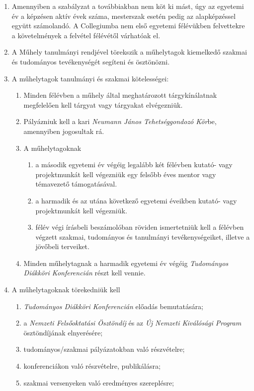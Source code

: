 \documentclass{../styles/rulebook}
\begin{document}
\begin{enumerate}
\item Amennyiben a szabályzat a továbbiakban nem köt ki mást, úgy az egyetemi év a képzésen aktív évek száma, mesterszak esetén pedig az alapképzéssel együtt számolandó. A Collegiumba nem első egyetemi félévükben felvettekre a követelmények a felvétel félévétől várhatóak el.
\item A Műhely tanulmányi rendjével törekszik a műhelytagok kiemelkedő szakmai és tudományos tevékenységét segíteni és ösztönözni.
\item A műhelytagok tanulmányi és szakmai kötelességei:
	\begin{enumerate}
		\item Minden félévben a műhely által meghatározott tárgykínálatnak megfelelően kell tárgyat vagy tárgyakat elvégezniük.
		\item Pályázniuk kell a kari \emph{Neumann János Tehetséggondozó Kör}be, amennyiben jogosultak rá.
		\item A műhelytagoknak
			\begin{enumerate}
				\item a második egyetemi év végéig legalább két félévben kutató- vagy projektmunkát kell végezniük egy felsőbb éves mentor vagy témavezető támogatásával.
				\item a harmadik és az utána következő egyetemi éveikben kutató- vagy projektmunkát kell végezniük.
				\item félév végi írásbeli beszámolóban röviden ismertetniük kell a félévben végzett szakmai, tudományos és tanulmányi tevékenységeiket, illetve a jövőbeli terveiket.
			\end{enumerate}
		\item Minden műhelytagnak a harmadik egyetemi év végéig \emph{Tudományos Diákköri Konferencián} részt kell vennie.
	\end{enumerate}
\item A műhelytagoknak törekedniük kell
	\begin{enumerate}
		\item \emph{Tudományos Diákköri Konferencián} előadás bemutatására;
		\item a \emph{Nemzeti Felsőoktatási Ösztöndíj} és az \emph{Új Nemzeti Kiválósági Program} ösztöndíjának elnyerésére;
		\item tudományos/szakmai pályázatokban való részvételre;
		\item konferenciákon való részvételre, publikálásra;
		\item szakmai versenyeken való eredményes szereplésre;

\end{enumerate}
\end{enumerate}
\end{document}

